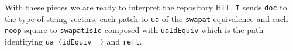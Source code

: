 \begin{code}
\AgdaOperator{\AgdaFunction{]\%=}}\AgdaSpace{}%
\AgdaSpace{}%
\AgdaSymbol{)}\AgdaSpace{}%
\AgdaSpace{}%
\<%
\\
\>[.][@{}l@{}]\<[727I]%
\>[18]\AgdaSpace{}%
\AgdaOperator{\AgdaFunction{[}}\AgdaSpace{}%
\AgdaSpace{}%
\AgdaOperator{\AgdaFunction{]\%=}}\AgdaSpace{}%
%
\>[48]\AgdaSpace{}%
\AgdaSpace{}%
\<%
\\
%
\>[18]\AgdaSpace{}%
\AgdaSpace{}%
\<%
\\
%
\\[\AgdaEmptyExtraSkip]%
\>[0]\AgdaSpace{}%
\AgdaSymbol{:}\AgdaSpace{}%
\AgdaSymbol{\{}\AgdaSpace{}%
\AgdaSymbol{:}\AgdaSpace{}%
\AgdaSymbol{\}}\AgdaSpace{}%
\AgdaSymbol{\{}\AgdaSpace{}%
\AgdaSymbol{:}\AgdaSpace{}%
\AgdaSpace{}%
\AgdaSymbol{\}}\AgdaSpace{}%
\AgdaSpace{}%
\AgdaSpace{}%
\AgdaSymbol{(}\AgdaSpace{}%
\AgdaOperator{\AgdaInductiveConstructor{,}}\AgdaSpace{}%
\AgdaSymbol{)}\AgdaSpace{}%
\AgdaSpace{}%
\AgdaSpace{}%
\AgdaSpace{}%
\<%
\\
\>[0]\AgdaSpace{}%
\AgdaSymbol{=}\AgdaSpace{}%
\AgdaSpace{}%
\<%
\end{code}
With these pieces we are ready to interpret the repository HIT.
\texttt{I} sends \texttt{doc} to the type of string vectors, each patch to \texttt{ua} of the
\texttt{swapat} equivalence and each \texttt{noop} square to \texttt{swapatIsId} composed with
\texttt{uaIdEquiv} which is the path identifying \texttt{ua (idEquiv \_)} and \texttt{refl}.

